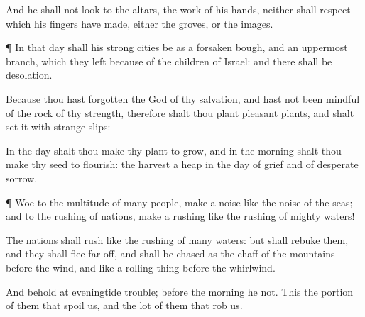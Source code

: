 {And he shall not
look to the
altars, the
work of his
hands, neither shall
respect
{} which his
fingers have
made, either the
groves, or the
images.


\par }{\PP {}¶ In that
day shall his
strong
cities be as a
forsaken
bough, and an uppermost
branch, which they
left
because of the
children of
Israel: and there shall be
desolation.

Because thou hast
forgotten the
God of thy
salvation, and hast not been
mindful of the
rock of thy
strength, therefore shalt thou
plant
pleasant
plants, and shalt
set it with
strange
slips:

In the
day shalt thou make thy
plant to
grow, and in the
morning shalt thou make thy
seed to
flourish:
{} the
harvest
{} a
heap in the
day of
grief and of
desperate
sorrow.


\par }{\PP {}¶
Woe to the
multitude of
many
people,
{} make a
noise like the
noise of the
seas; and to the
rushing of
nations,
{} make a rushing like the
rushing of
mighty
waters!

The
nations shall
rush like the
rushing of
many
waters: but
{} shall
rebuke them, and they shall
flee far
off, and shall be
chased as the
chaff of the
mountains
before the
wind, and like a rolling
thing
before the
whirlwind.

And behold at
eveningtide
trouble;
{} before the
morning he
{} not. This
{} the
portion of them that
spoil us, and the
lot of them that
rob us.




\par }
